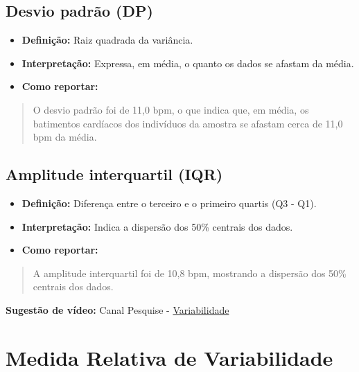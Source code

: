 \documentclass[
]{book}
\providecommand{\tightlist}{%
  \setlength{\itemsep}{0pt}\setlength{\parskip}{0pt}}
\begin{document}
\subsection{Desvio padrão (DP)}\label{desvio-padruxe3o-dp}

\begin{itemize}
\tightlist
\item
  \textbf{Definição:} Raiz quadrada da variância.\\
\item
  \textbf{Interpretação:} Expressa, em média, o quanto os dados se afastam da média.\\
\item
  \textbf{Como reportar:}
\end{itemize}

\begin{quote}
O desvio padrão foi de 11,0 bpm, o que indica que, em média, os batimentos cardíacos dos indivíduos da amostra se afastam cerca de 11,0 bpm da média.
\end{quote}

\subsection{Amplitude interquartil (IQR)}\label{amplitude-interquartil-iqr}

\begin{itemize}
\tightlist
\item
  \textbf{Definição:} Diferença entre o terceiro e o primeiro quartis (Q3 - Q1).\\
\item
  \textbf{Interpretação:} Indica a dispersão dos 50\% centrais dos dados.\\
\item
  \textbf{Como reportar:}
\end{itemize}

\begin{quote}
A amplitude interquartil foi de 10,8 bpm, mostrando a dispersão dos 50\% centrais dos dados.
\end{quote}

\textbf{Sugestão de vídeo:} Canal Pesquise - \href{https://youtu.be/sISPcOIcwXs}{Variabilidade}

\section{Medida Relativa de Variabilidade}\label{medida-relativa-de-variabilidade}
\end{document}
